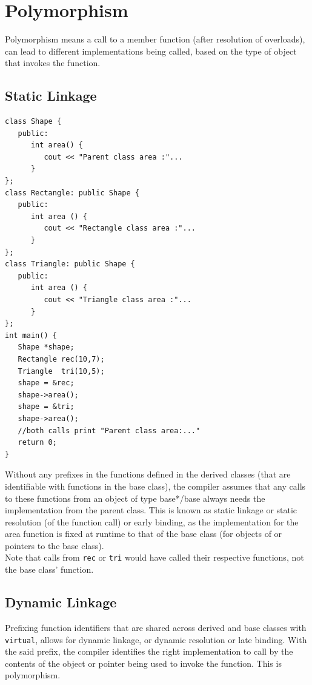 \documentclass{report}
\begin{document}
    \section{Polymorphism}
Polymorphism means a call to a member function (after resolution of overloads), can lead to different implementations being called, based on the type of object that invokes the function.
\subsection{Static Linkage}
\begin{lstlisting}
class Shape {
   public:
      int area() {
         cout << "Parent class area :"...
      }
};
class Rectangle: public Shape {
   public:
      int area () { 
         cout << "Rectangle class area :"...
      }
};
class Triangle: public Shape {
   public:
      int area () { 
         cout << "Triangle class area :"... 
      }
};
int main() {
   Shape *shape;
   Rectangle rec(10,7);
   Triangle  tri(10,5);
   shape = &rec;
   shape->area();
   shape = &tri;   
   shape->area();
   //both calls print "Parent class area:..."
   return 0;
}
\end{lstlisting}
Without any prefixes in the functions defined in the derived classes (that are identifiable with functions in the base class),
the compiler assumes that any calls to these functions from an object of type base*/base always needs the implementation from the parent class. This is known as static linkage or static resolution (of the function call) or early binding, as the implementation for the area function is fixed at runtime to that of the base class (for objects of or pointers to the base class).\\
Note that calls from \texttt{rec} or \texttt{tri} would have called their respective functions, not the base class' function.
\subsection{Dynamic Linkage}
Prefixing function identifiers that are shared across derived and base classes with \texttt{virtual}, allows for dynamic linkage, or dynamic resolution or late binding. With the said prefix, the compiler identifies the right implementation to call by the contents of the object or pointer being used to invoke the function. This is polymorphism.
\end{document}
